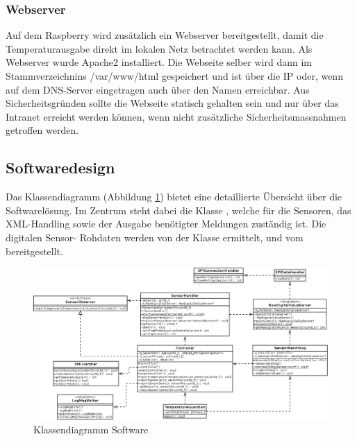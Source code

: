 \subsubsection{Webserver}
Auf dem Raspberry wird zusätzlich ein Webserver bereitgestellt, damit die Temperaturausgabe direkt im lokalen Netz betrachtet werden kann. Als Webserver wurde Apache2 installiert. Die Webseite selber wird dann im Stammverzeichnins /var/www/html gespeichert und ist über die IP oder, wenn auf dem DNS-Server eingetragen auch über den Namen erreichbar. Aus Sicherheitsgründen sollte die Webseite statisch gehalten sein und nur über das Intranet erreicht werden können, wenn nicht zusätzliche Sicherheitsmassnahmen getroffen werden. 

\subsection{Softwaredesign}

Das Klassendiagramm (Abbildung \ref{fig:classdia}) bietet eine detaillierte Übersicht über die Softwarelösung. Im Zentrum steht dabei die Klasse , welche für die Sensoren, das XML-Handling sowie der Ausgabe benötigter Meldungen zuständig ist. Die digitalen Sensor- Rohdaten werden von der Klasse  ermittelt, und vom  bereitgestellt.

\begin{figure}[H]%
\centering
\includegraphics[width=1\textwidth]{Images/Klassendiagramm.png}
\caption{Klassendiagramm Software}
\label{fig:classdia}
\end{figure}

